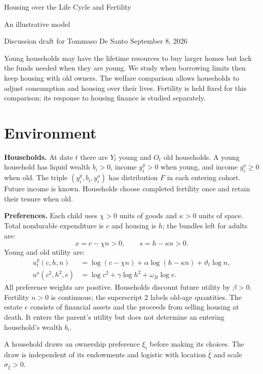 \documentclass[11pt]{article}
\begin{document}
\begin{center}
{\Large Housing over the Life Cycle and Fertility}\par
\smallskip
{\large An illustrative model}\par
\smallskip
{\small Discussion draft for Tommaso De Santo \quad September 8, 2026}
\end{center}
\medskip

Young households may have the lifetime resources to buy larger homes but lack
the funds needed when they are young. We study when borrowing limits then keep
housing with old owners. The welfare comparison allows households to adjust
consumption and housing over their lives. Fertility is held fixed for this
comparison; its response to housing finance is studied separately.

\section{Environment}

\textbf{Households.} At date $t$ there are $Y_t$ young and $O_t$ old households.
A young household has liquid wealth $b_i>0$, income $y_i^y>0$ when young, and
income $y_i^o\ge0$ when old. The triple $(y_i^y,b_i,y_i^o)$ has distribution $F$
in each entering cohort. Future income is known. Households choose completed
fertility once and retain their tenure when old.

\textbf{Preferences.} Each child uses $\chi>0$ units of goods and $\kappa>0$
units of space. Total nondurable expenditure is $c$ and housing is $h$; the
bundles left for adults are:
\begin{equation}
x=c-\chi n>0,\qquad s=h-\kappa n>0.
\end{equation}
Young and old utility are:
\begin{align}
u_t^y(c,h,n)&=\log(c-\chi n)+\alpha\log(h-\kappa n)+\vartheta_t\log n,
\label{eq:new_uy}\\
u^o(c^2,h^2,e)&=\log c^2+\gamma\log h^2+\omega_B\log e.
\label{eq:new_uo}
\end{align}
All preference weights are positive. Households discount future utility by
$\beta>0$. Fertility $n>0$ is continuous; the superscript 2 labels old-age
quantities. The estate $e$ consists of financial assets and the proceeds from
selling housing at death. It enters the parent's utility but does not determine
an entering household's wealth $b_i$.

A household draws an ownership preference $\xi_i$ before making its choices.
The draw is independent of its endowments and logistic with location $\bar\xi$
and scale $\sigma_\xi>0$.
\end{document}
